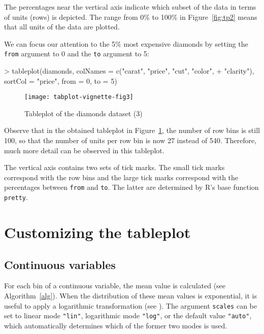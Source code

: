 \documentclass[11pt, fleqn, a4paper]{article}
\begin{document}
The percentages near the vertical axis indicate which subset of the data in terms of units (rows) is depicted. The range from 0\% to 100\% in Figure~\ref{fig:tp2} means that all units of the data are plotted. 


We can focus our attention to the 5\% most expensive diamonds by setting the {\tt from} argument to 0 and the {\tt to} argument to 5:

\begin{Schunk}
\begin{Sinput}
> tableplot(diamonds, colNames = c("carat", "price", "cut", "color", 
+     "clarity"), sortCol = "price", from = 0, to = 5)
\end{Sinput}
\end{Schunk}

\begin{figure}[htp]
\begin{center}
\texttt{[image: tabplot-vignette-fig3]}
\end{center}
\caption{Tableplot of the diamonds dataset (3)}
\label{fig:tp3}
\end{figure}


Observe that in the obtained tableplot in Figure~\ref{fig:tp3}, the number of row bins is still 100, so that the number of units per row bin is now 27 instead of 540. Therefore, much more detail can be observed in this tableplot.

The vertical axis contains two sets of tick marks. The small tick marks correspond with the row bins and the large tick marks correspond with the percentages between {\tt from} and {\tt to}. The latter are determined by R's base function {\tt pretty}.


\section{Customizing the tableplot}


\subsection{Continuous variables}

For each bin of a continuous variable, the mean value is calculated (see Algorithm~\ref{alg}).
When the distribution of these mean values is exponential, it is useful to apply a logarithmic transformation (see \cite{ten11}). The argument {\tt scales} can be set to linear mode {\tt "lin"}, logarithmic mode {\tt "log"}, or the default value {\tt "auto"}, which automatically determines which of the former two modes is used.
\end{document}
